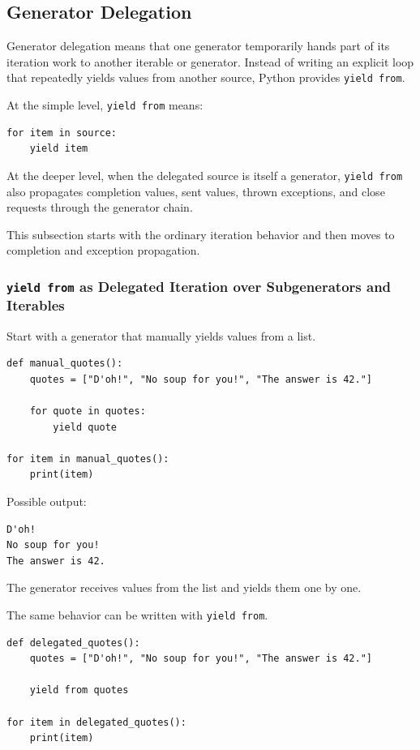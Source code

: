 \subsection{Generator Delegation}

Generator delegation means that one generator temporarily hands part of its iteration work to another iterable or generator. Instead of writing an explicit loop that repeatedly yields values from another source, Python provides \texttt{yield from}.

At the simple level, \texttt{yield from} means:

\begin{verbatim}
for item in source:
    yield item
\end{verbatim}

At the deeper level, when the delegated source is itself a generator, \texttt{yield from} also propagates completion values, sent values, thrown exceptions, and close requests through the generator chain.

This subsection starts with the ordinary iteration behavior and then moves to completion and exception propagation.

\subsubsection{\texttt{yield from} as Delegated Iteration over Subgenerators and Iterables}

Start with a generator that manually yields values from a list.

\begin{verbatim}
def manual_quotes():
    quotes = ["D'oh!", "No soup for you!", "The answer is 42."]

    for quote in quotes:
        yield quote

for item in manual_quotes():
    print(item)
\end{verbatim}

Possible output:

\begin{verbatim}
D'oh!
No soup for you!
The answer is 42.
\end{verbatim}

The generator receives values from the list and yields them one by one.

The same behavior can be written with \texttt{yield from}.

\begin{verbatim}
def delegated_quotes():
    quotes = ["D'oh!", "No soup for you!", "The answer is 42."]

    yield from quotes

for item in delegated_quotes():
    print(item)
\end{verbatim}

